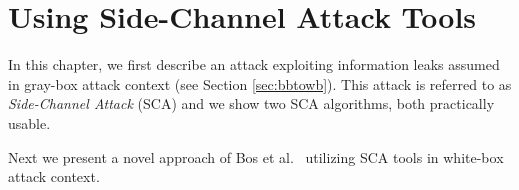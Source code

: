 \chapter{Using Side-Channel Attack Tools}
\label{chap:attack}

In this chapter, we first describe an attack exploiting information leaks assumed in gray-box attack context (see Section \ref{sec:bbtowb}). This attack is referred to as {\em Side-Channel Attack} (SCA) and we show two SCA algorithms, both practically usable.

Next we present a novel approach of Bos et al.\ \cite{bos2015differential} utilizing SCA tools in white-box attack context.





